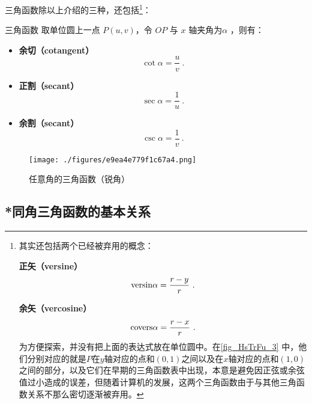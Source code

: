 三角函数除以上介绍的三种，还包括\footnote{其实还包括两个已经被弃用的概念：

\textbf{正矢（versine）}\begin{equation}
\mathrm{versin }\alpha=\displaystyle{r-y\over r}~.
\end{equation}

\textbf{余矢（vercosine）}
\begin{equation}
\mathrm{covers }\alpha=\displaystyle{r-x\over r}~.
\end{equation}
为方便探索，并没有把上面的表达式放在单位圆中。在\autoref{fig_HsTrFu_3} 中，他们分别对应的就是$P$在$y$轴对应的点和$(0,1)$之间以及在$x$轴对应的点和$(1,0)$之间的部分，以及它们在早期的三角函数表中出现，本意是避免因正弦或余弦值过小造成的误差，但随着计算机的发展，这两个三角函数由于与其他三角函数关系不那么密切逐渐被弃用。}：
\begin{definition}{三角函数}
取单位圆上一点 $P(u,v)$，令 $OP$ 与 $x$ 轴夹角为$\alpha$ ，则有：
\begin{itemize}
\item \textbf{余切（cotangent）}
\begin{equation}
\displaystyle\cot \alpha = \frac{u}{v}~.
\end{equation}
\item \textbf{正割（secant）}
\begin{equation}
\displaystyle\sec \alpha = \frac{1}{u}~.
\end{equation}
\item \textbf{余割（secant）}
\begin{equation}
\displaystyle\csc \alpha = \frac{1}{v}~.
\end{equation}
\end{itemize}
\end{definition}
\begin{figure}[ht]
\centering
\texttt{[image: ./figures/e9ea4e779f1c67a4.png]}
\caption{任意角的三角函数（锐角）} \label{fig_HsTrFu_3}
\end{figure}

\subsection{*同角三角函数的基本关系}

